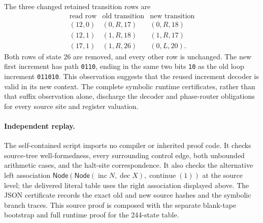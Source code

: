 The three changed retained transition rows are
\[
\begin{array}{c|c|c}
\text{read row}&\text{old transition}&\text{new transition}\\\hline
(12,0)&(0,R,17)&(0,R,18)\\
(12,1)&(1,R,18)&(1,R,17)\\
(17,1)&(1,R,26)&(0,L,20).
\end{array}
\]
Both rows of state 26 are removed, and every other row is unchanged.
The new first increment has path \texttt{0110}, ending in the same
two bits \texttt{10} as the old loop increment \texttt{011010}.
This observation suggests that the reused increment decoder is valid in
its new context.  The complete symbolic runtime certificates, rather
than that suffix observation alone, discharge the decoder and phase-router
obligations for every source site and register valuation.

\paragraph{Independent replay.}
The self-contained script  imports no
compiler or inherited proof code.  It checks source-tree well-formedness,
every surrounding control edge, both unbounded arithmetic cases, and
the halt-site correspondence.  It also checks the alternative left
association
$\mathsf{Node}(\mathsf{Node}(\operatorname{inc}N,
\operatorname{dec}X),\operatorname{continue}(1))$ at the source level;
the delivered literal table uses the right association displayed above.
The JSON certificate records the exact old and new source hashes and
the symbolic branch traces.  This source proof is composed with the
separate blank-tape bootstrap and full runtime proof for the 244-state
table.
